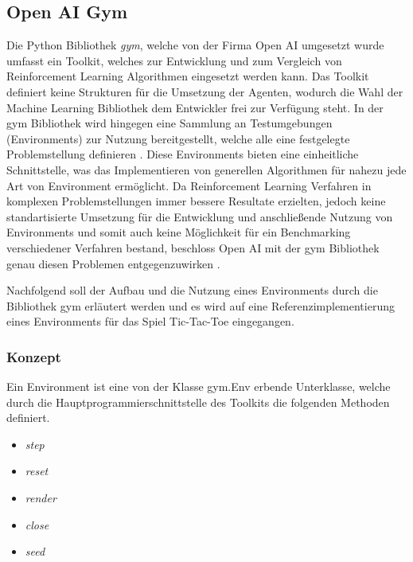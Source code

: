 \documentclass[11pt]{scrartcl}
\begin{document}
\subsection{Open AI Gym}
Die Python Bibliothek \textit{gym}, welche von der Firma Open AI umgesetzt wurde umfasst ein
Toolkit, welches zur Entwicklung und zum Vergleich von Reinforcement Learning Algorithmen
eingesetzt werden kann. Das Toolkit definiert keine Strukturen für die Umsetzung der Agenten,
wodurch die Wahl der Machine Learning Bibliothek dem Entwickler frei zur Verfügung steht. In
der gym Bibliothek wird hingegen eine Sammlung an Testumgebungen (Environments) zur Nutzung
bereitgestellt, welche alle eine festgelegte Problemstellung definieren \cite{OAI2016}. 
Diese Environments bieten eine einheitliche Schnittstelle, was das Implementieren von
generellen Algorithmen für nahezu jede Art von Environment ermöglicht. Da Reinforcement
Learning Verfahren in komplexen Problemstellungen immer bessere Resultate erzielten, jedoch
keine standartisierte Umsetzung für die Entwicklung und anschließende Nutzung von Environments
und somit auch keine Möglichkeit für ein Benchmarking verschiedener Verfahren bestand,
beschloss Open AI mit der gym Bibliothek genau diesen Problemen entgegenzuwirken
\cite{OAI2016}.

Nachfolgend soll der Aufbau und die Nutzung eines Environments durch die Bibliothek gym
erläutert werden und es wird auf eine Referenzimplementierung eines Environments für das
Spiel Tic-Tac-Toe eingegangen.


\subsubsection{Konzept}
Ein Environment ist eine von der Klasse gym.Env erbende Unterklasse, welche durch die
Hauptprogrammierschnittstelle des Toolkits die folgenden Methoden definiert.

\begin{itemize}
\itemsep-6pt
\item \textit{step}
\item \textit{reset}
\item \textit{render}
\item \textit{close}
\item \textit{seed}
\end{itemize}  
\end{document}
